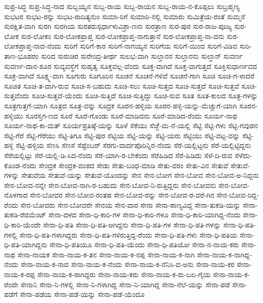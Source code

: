 {ಸುಪ್ರ-ಸಿದ್ಧ
ಸುಪ್ರ-ಸಿದ್ಧ-ನಾದ
ಸುಬ್ಬಯ್ಯನ
ಸುಬ್ಬ-ರಾಯ
ಸುಬ್ಬ-ರಾಯನ
ಸುಬ್ಬ-ರಾಯ-ನ-ಕೊಪ್ಪಲು
ಸುಬ್ರಹ್ಮಣ್ಯ
ಸುಭಟರ
ಸುಭಟ-ರನ್ನು
ಸುಭಟ-ರಾದಿತ್ಯನುಂ
ಸುಮಾ-ರಿಗೆ
ಸುಮಾರಿ-ನಲ್ಲಿ
ಸುಮಾರು
ಸುಮಿತ್ರೆಯ-ರಂತೆ
ಸುಮ್ಮನೆ
ಸುರಕ್ಷಿತ-ವಾಗಿ
ಸುರಗಿ
ಸುರಗಿಯ
ಸುರತರುಸ್ಪರ್ಧಾಳುವಿಶ್ರಾ-ಣನಃ
ಸುರತ್ರಾಣ
ಸುರ-ಪುರ
ಸುರ-ರಾಜ-ಪೂಜ್ಯ
ಸುರ-ಲೋಕ
ಸುರ-ಲೋಕಂ
ಸುರ-ಲೋಕಪ್ರಾಪ್ತ
ಸುರ-ಲೋಕಪ್ರಾಪ್ತ-ನಾಗುತ್ತಾನೆ
ಸುರ-ಲೋಕಪ್ರಾಪ್ತ-ನಾ-ದನು
ಸುರ-ಲೋಕಪ್ರಾಪ್ತ-ನಾದ-ನೆಂದು
ಸುರಿಗೆ
ಸುರಿಗೆ-ಕಾರ
ಸುರಿಗೆ-ನಾಗಯ್ಯನ
ಸುರಿಗೆಯ
ಸುರಿಗೆ-ಯಿಂದ
ಸುರಿಗೆ-ವಿಡಿವ
ಸುರಿ-ತಾಣ-ಭೂಪರಂ
ಸುರಿದ
ಸುರುಚಿರ
ಸುರೇಂದ್ರ-ತೀರ್ಥ
ಸುಲಭ-ವಾಗಿ
ಸುಲ್ತಾನನ
ಸುಲ್ತಾನನು
ಸುಲ್ತಾನ್
ಸುವರ್ಣ
ಸುವರ್ಣ-ದಾನ-ಶೂರ
ಸುವ್ಯವಸ್ಥೆಗೆ
ಸುಹೃತ್ವ
ಸೂಕ್ತವಲ್ಲ-ವೆಂದು
ಸೂಕ್ತ-ವಾಗಿದೆ
ಸೂಕ್ತ-ವಾಗುತ್ತದೆ
ಸೂಕ್ತಿಸುಧಾರ್ಣವದ
ಸೂಕ್ರ-ವಾಗಿದೆ
ಸೂಕ್ಷ್ಮ-ವಾಗಿ
ಸೂಗುರು
ಸೂಗೂರಿನ
ಸೂಚನೆ
ಸೂಚನೆ-ಗಳಿವೆ
ಸೂಚನೆ-ಗಾಗಿ
ಸೂಚಿ
ಸೂಚಿ-ಗ-ಳಾದರೆ
ಸೂಚಿತ
ಸೂಚಿ-ತ-ವಾಗಿ-ರುವ
ಸೂಚಿ-ಸ-ಬಹುದು
ಸೂಚಿ-ಸಲು
ಸೂಚಿ-ಸುತ್ತದ
ಸೂಚಿ-ಸುತ್ತದೆ
ಸೂಚಿ-ಸುತ್ತವೆ
ಸೂಚಿ-ಸುತ್ತವೆಂದು
ಸೂಚಿ-ಸುತ್ತವೆ-ಯೆಂದು
ಸೂಚಿ-ಸುತ್ತಿದೆ
ಸೂಚಿ-ಸುತ್ತಿದ್ದು
ಸೂಚಿ-ಸುವ
ಸೂತ
ಸೂತ-ಕುಲದ
ಸೂತ್ರ-ಗಳನ್ನು
ಸೂತ್ರಗುತ್ತಗೆ-ಯಾಗಿ
ಸೂತ್ರದ
ಸೂತ್ರ-ವನ್ನು
ಸೂದ್ರಕ
ಸೂರನ-ಹಳ್ಳಿಯ
ಸೂರನ-ಹಳ್ಳಿ-ಯನ್ನು-ಮೆಚ್ಚುಗೆ-ಯಾಗಿ
ಸೂರನ-ಹಳ್ಳಿಯು
ಸೂರಸ್ತಗ-ಣದ
ಸೂರೆ
ಸೂರೆ-ಗೊಂಡು
ಸೂರೆ-ಮಾಡಿದನು
ಸೂರೆ-ಮಾಡಿದ-ರೆಂದು
ಸೂರ್ಯ-ನಾಥ
ಸೂರ್ಯ-ನಾಥ-ಕಾ-ಮತ್
ಸೂರ್ಯಪ್ರತಿಷ್ಠೆ-ಯನ್ನು
ಸೂಳೆ
ಸೆಕೆಯು
ಸೆಜ್ಜೆೆ-ಮ-ನೆ-ಯಲ್ಲಿ
ಸೆಟ್ಟಿ
ಸೆಟ್ಟಿ-ಗಳು
ಸೆಟ್ಟಿ-ಗವುಡನ
ಸೆಟ್ಟಿ-ಗೆರೆ
ಸೆಟ್ಟಿ-ಗೆರೆಯು
ಸೆಟ್ಟಿ-ತಿಗೂ
ಸೆಟ್ಟಿ-ಪುರ
ಸೆಟ್ಟಿಯ
ಸೆಟ್ಟಿ-ಯನ್ನು
ಸೆಟ್ಟಿ-ಯರು
ಸೆಟ್ಟಿಯು
ಸೆಟ್ಟಿ-ವಟ್ಟ-ವನ್ನು
ಸೆಟ್ಟಿ-ಹಳ್ಳಿ
ಸೆಟ್ಟಿ-ಹಳ್ಳಿಯ
ಸೆಣಸಿ
ಸೆಣಸೆ
ಸೆಪ್ಟೆಂಬರ್
ಸೆರಗು-ವಾರ್ದಪೊರಿನ್ನಿರ-ನೆಂದು
ಸೆರೆ-ಯಲ್ಲಿಟ್ಟನು
ಸೆರೆ-ಯಲ್ಲಿಟ್ಟಿದ್ದನು
ಸೆರೆಯಲ್ಲಿಟ್ಟು
ಸೆರೆ-ಯಲ್ಲಿ-ಡಿ-ಸಿದ-ನೆಂದು
ಸೆರೆ-ಯಾಗಿ-ರ-ಬೇಕೆಂದು
ಸೆರೆಹಿಡಿದ
ಸೆರೆ-ಹಿಡಿದು
ಸೆಳೆ-ದಿ-ರುವ
ಸೆಳೆದು-ಕೊಂಡ-ನೆಂದು
ಸೇಂದ್ರಕ
ಸೇಂದ್ರಕ-ವಂಶದ
ಸೇಡು
ಸೇತು-ಬಂಧ-ಮಾಡಿ
ಸೇತು-ವರಂ
ಸೇತು-ವಿನ
ಸೇತುವೆ
ಸೇತುವೆ-ಗಳನ್ನು
ಸೇತುವೆಯ
ಸೇತುವೆ-ಯನ್ನು
ಸೇತುವೆ-ಯೊಂದನ್ನು
ಸೇನ
ಸೇನ-ಬೋಗ
ಸೇನ-ಬೋವ
ಸೇನ-ಬೋವ-ಅ-ನಿದ್ದನು
ಸೇನ-ಬೋವ-ನನ್ನೇ
ಸೇನ-ಬೋವ-ನಾಗಿ-ರ-ಬಹುದು
ಸೇನ-ಬೋವ-ನಿ-ರುತ್ತಿದ್ದನು
ಸೇನ-ಬೋವನು
ಸೇನ-ಬೋವ-ನೊಳಗಾದ
ಸೇನ-ಬೋವರ
ಸೇನ-ಬೋವ-ರಂತಹ
ಸೇನ-ಬೋವ-ರನ್ನು
ಸೇನ-ಬೋವ-ರ-ವರೆ-ಗಿನ
ಸೇನ-ಬೋವ-ರಿದ್ದ-ರೆಂದು
ಸೇನ-ಬೋವರು
ಸೇನ-ಬೋವರೇ
ಸೇನಯ
ಸೇನ-ವಾರ
ಸೇನಾ
ಸೇನಾ-ಠಾಣ್ಯವಿದ್ದ
ಸೇನಾ-ತುಕಡಿ-ಯನ್ನು
ಸೇನಾ-ತುಕಡಿ-ರೆಜಿಮೆಂಟ್
ಸೇನಾ-ದಳದ
ಸೇನಾ-ಧಿ-ಕಾರಿ-ಗಳ
ಸೇನಾ-ಧಿ-ಕಾರಿ-ಗಳೂ
ಸೇನಾ-ಧಿ-ಕಾರಿ-ಯಾಗಿದ್ದ-ನೆಂದು
ಸೇನಾ-ಧಿ-ಕಾರಿ-ಯೆಂದೇ
ಸೇನಾ-ಧಿ-ಪತಿ
ಸೇನಾ-ಧಿ-ಪತಿ-ಆಗಿದ್ದನು
ಸೇನಾ-ಧಿ-ಪತಿ-ಗಳ
ಸೇನಾ-ಧಿ-ಪತಿ-ಗಳನ್ನು
ಸೇನಾ-ಧಿ-ಪತಿ-ಗಳಲ್ಲಿ
ಸೇನಾ-ಧಿ-ಪತಿ-ಗಳಾಗಿದ್ದರು
ಸೇನಾ-ಧಿ-ಪತಿ-ಗಳಿರುತ್ತಿದ್ದ-ರೆಂದು
ಸೇನಾ-ಧಿ-ಪತಿ-ಗಳು
ಸೇನಾ-ಧಿ-ಪತಿಯ
ಸೇನಾ-ಧಿ-ಪತಿ-ಯಾಗಿದ್ದನು
ಸೇನಾ-ಧಿ-ಪತಿಯೂ
ಸೇನಾ-ಧಿ-ಪತಿ-ಯೆಂದು
ಸೇನಾ-ಧಿ-ಪತಿಯೋ
ಸೇನಾ-ನ-ನಾಯ-ಕರು
ಸೇನಾ-ನಾಥ
ಸೇನಾ-ನಾಯಕ
ಸೇನಾ-ನಾಯ-ಕ-ತನ
ಸೇನಾ-ನಾಯ-ಕ-ನಪ್ಪ
ಸೇನಾ-ನಾಯ-ಕ-ನಾಗಿ
ಸೇನಾ-ನಾಯ-ಕ-ನಾಗಿದ್ದ-ನೆಂದು
ಸೇನಾ-ನಾಯ-ಕ-ನಾದ
ಸೇನಾ-ನಾಯ-ಕ-ನೆಂದು
ಸೇನಾ-ನಾಯ-ಕ-ನೆನಿಸಿ-ದ-ಅನು
ಸೇನಾ-ನಾಯ-ಕರ
ಸೇನಾ-ನಾಯ-ಕ-ರಪ್ಪ
ಸೇನಾ-ನಾಯ-ಕ-ರಾಗಿದ್ದರು
ಸೇನಾ-ನಾಯ-ಕರು
ಸೇನಾ-ನಾಯ-ಕ-ರು-ಬಲ-ಗೈಯ
ಸೇನಾ-ನಾಯ-ಕ-ರೆಂದೇ
ಸೇನಾನಿ
ಸೇನಾ-ನಿ-ಗಳಲ್ಲಿ
ಸೇನಾ-ನಿ-ಗಳಾಗಿದ್ದ
ಸೇನಾ-ನಿ-ಯಾಗಿದ್ದ
ಸೇನಾ-ನೆಲೆ-ಯನ್ನು
ಸೇನಾ-ಪಡೆ
ಸೇನಾ-ಪಡೆಗೆ
ಸೇನಾ-ಪಡೆಯ
ಸೇನಾ-ಪಡೆ-ಯನ್ನು
ಸೇನಾ-ಪಡೆ-ಯೆಂದೂ
}
